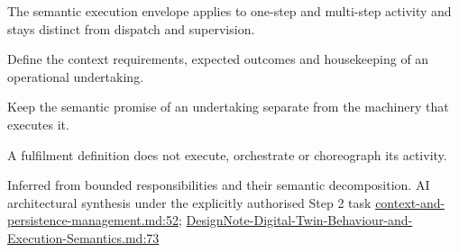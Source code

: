 The semantic execution envelope applies to one-step and multi-step activity and stays distinct from dispatch and supervision.



Define the context requirements, expected outcomes and housekeeping of an operational undertaking.



Keep the semantic promise of an undertaking separate from the machinery that executes it.



A fulfilment definition does not execute, orchestrate or choreograph its activity.


Inferred from bounded responsibilities and their semantic decomposition. AI architectural synthesis under the explicitly authorised Step 2 task \hyperref[evidence:ea0c62dfd5edfd4a]{context-and-persistence-management.md:52}; \hyperref[evidence:ec6250f7cf7c29a5]{DesignNote-Digital-Twin-Behaviour-and-Execution-Semantics.md:73}
